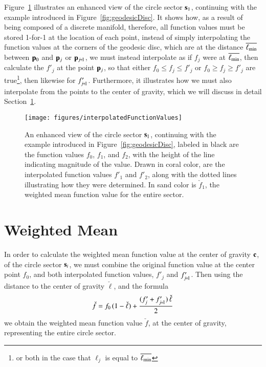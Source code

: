 Figure~\ref{fig:interpolatedFunctionValues} illustrates an enhanced view of the circle sector $\mathbf{s}_1$, continuing with the example introduced in Figure~\ref{fig:geodesicDisc}. It shows how, as a result of \tdd{} being composed of a discrete manifold, therefore, all function values must be stored 1-for-1 at the location of each point, instead of simply interpolating the function values at the corners of the geodesic disc, which are at the distance $\overline{\ell_\text{min}}$ between $\mathbf{p}_0$ and $\mathbf{p}_j$ or $\bp_{\sjpo}$, we must instead interpolate as if $f_j$ were at $\overline{\ell_\text{min}}$, then calculate the $f'_j$ at the point $\mathbf{p}_j$, so that either $f_0 \leq f_j \leq f'_j$ or $f_0 \geq f_j \geq f'_j$ are true\footnote{or both in the case that $\ell_j$ is equal to $\overline{\ell_\text{min}}$}, then likewise for $f'_{\sjpo}$. Furthermore, it illustrates how we must also interpolate from the points to the center of gravity, which we will discuss in detail Section~\ref{ch4sWM}.

\begin{figure}[ht]
\ffigbox
	{\texttt{[image: figures/interpolatedFunctionValues]}}
	{\caption[Interpolation of Function Values toward the Center of Gravity]{An enhanced view of the circle sector $\mathbf{s}_1$, continuing with the example introduced in Figure~\ref{fig:geodesicDisc}, labeled in black are the function values $f_0$, $f_1$, and $f_2$, with the height of the line indicating magnitude of the value. Drawn in coral color, are the interpolated function values $f'_1$ and $f'_2$, along with the dotted lines illustrating how they were determined. In sand color is $\check{f}_1$, the weighted mean function value for the entire sector.}\label{fig:interpolatedFunctionValues}}
\end{figure}

%
%
%
%
\section{Weighted Mean}
\label{ch4sWM}
In order to calculate the weighted mean function value at the center of gravity $\mathbf{c}$, of the circle sector $\mathbf{s}_i$, we must combine the original function value at the center point $f_0$, and both interpolated function values, $f'_j$ and $f'_{\sjpo}$. Then using the distance to the center of gravity $\check{\ell}$, and the formula
\begin{equation}
	\check{f} = f_0\,(1 - \check{\ell}) + \frac{(f'_j + f'_{\sjpo})\,\check{\ell}}{2}
	\label{eq:weightedMeanAtCoGatSector}
\end{equation}%
%
we obtain the weighted mean function value $\check{f}$, at the center of gravity, representing the entire circle sector.

